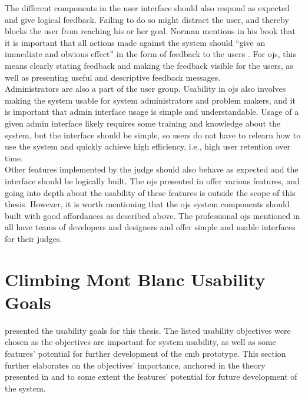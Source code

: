 The different components in the user interface should also respond as expected and give logical feedback. Failing to do so might distract the user, and thereby blocks the user from reaching his or her goal. Norman mentions in his book that it is important that all actions made against the system should ``give an immediate and obvious effect'' in the form of feedback to the users \cite{norman1988design}. For \glspl{oj}, this means clearly stating feedback and making the feedback visible for the users, as well as presenting useful and descriptive feedback messages.\\

Administrators are also a part of the user group. Usability in \glspl{oj} also involves making the system usable for system administrators and problem makers, and it is important that admin interface usage is simple and understandable. Usage of a given admin interface likely requires some training and knowledge about the system, but the interface should be simple, so users do not have to relearn how to use the system and quickly achieve high efficiency, i.e., high user retention over time. \\

Other features implemented by the judge should also behave as expected and the interface should be logically built. The \glspl{oj} presented in  offer various features, and going into depth about the usability of these features is outside the scope of this thesis. However, it is worth mentioning that the \glspl{oj} system components should built with good affordances as described above. The professional \glspl{oj} mentioned in  all have teams of developers and designers and offer simple and usable interfaces for their judges.

\section{Climbing Mont Blanc Usability Goals}
\label{sec:cmb-usability}
 presented the usability goals for this thesis. The listed usability objectives were chosen as the objectives are important for system usability, as well as some features' potential for further development of the \gls{cmb} prototype. This section further elaborates on the objectives' importance, anchored in the theory presented in  and to some extent the features' potential for future development of the system. \\

